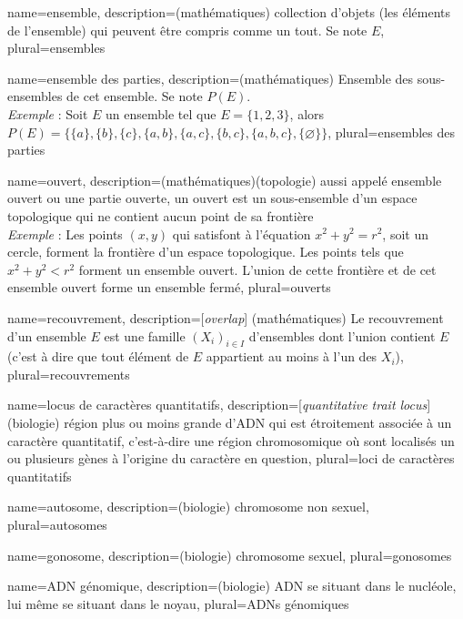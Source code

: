 {
	name={ensemble},
	description={(mathématiques) collection d’objets (les éléments de l'ensemble) qui peuvent être compris comme un tout. Se note $E$}, 
	plural={ensembles}
}

{
	name={ensemble des parties},
	description={(mathématiques) Ensemble des sous-ensembles de cet ensemble. Se note $P(E)$.\\\emph{Exemple} : Soit $E$ un ensemble tel que $E=\{1,2,3\}$, alors $P(E)=\{\{a\},\{b\},\{c\},\{a,b\},\{a,c\},\{b,c\} ,\{a,b,c\},\{\varnothing\}\}$}, 
	plural={ensembles des parties}
}

{
	name={ouvert},
	description={(mathématiques)(topologie) aussi appelé ensemble ouvert ou une partie ouverte, un ouvert est un sous-ensemble d'un espace topologique qui ne contient aucun point de sa frontière\\\emph{Exemple} : Les points $(x, y)$ qui satisfont à l'équation $x^2 + y^2 = r^2$, soit un cercle, forment la frontière d'un espace topologique. Les points tels que $x^2 + y^2 < r^2$ forment un ensemble ouvert. L'union de cette frontière et de cet ensemble ouvert forme un ensemble fermé}, 
	plural={ouverts}
}

{
	name={recouvrement},
	description={[\textit{overlap}] (mathématiques) Le recouvrement d'un ensemble $E$ est une famille $(X_i)_{i\in I}$ d'ensembles dont l'union contient $E$ (c'est à dire que tout élément de $E$ appartient au moins à l'un des $X_i$)},
	plural={recouvrements}
}

{
	name={locus de caract\`eres quantitatifs},
	description={[\textit{quantitative trait locus}] (biologie) région plus ou moins grande d'ADN qui est étroitement associée à un caractère quantitatif, c'est-à-dire une région chromosomique où sont localisés un ou plusieurs gènes à l'origine du caractère en question}, 
	plural={loci de caract\`eres quantitatifs}
}

{
	name={autosome},
	description={(biologie) chromosome non sexuel}, 
	plural={autosomes}
}

{
	name={gonosome},
	description={(biologie) chromosome sexuel}, 
	plural={gonosomes}
}

{
	name={ADN g\'enomique},
	description={(biologie) ADN se situant dans le nucléole, lui même se situant dans le noyau}, 
	plural={ADNs g\'enomiques}
}

